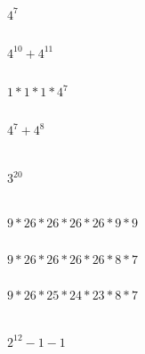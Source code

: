 \documentclass[letterpaper]{article}
\begin{document}
	\section{}
    	\subsection{} $4^7$
        \subsection{} $4^{10} + 4^{11}$
        \subsection{} $1 * 1 * 1 * 4^7$
        \subsection{} $4^7 + 4^8$
    \section{}
    	$3^{20}$ 
    \section{}
    	\subsection{} $9 * 26 * 26 * 26 * 26 * 9 * 9$
    	\subsection{} $9 * 26 * 26 * 26 * 26 * 8 * 7$
        \subsection{} $9 * 26 * 25 * 24 * 23 * 8 * 7$
    \section{}
    	$2^{12} - 1 - 1$
\end{document}
